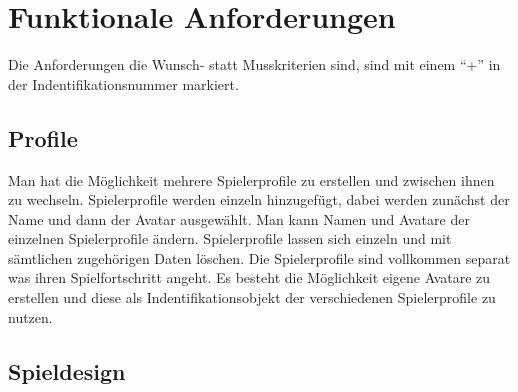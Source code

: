 \chapter{Funktionale Anforderungen}

Die Anforderungen die Wunsch- statt Musskriterien sind, sind mit einem "`+"' in der Indentifikationsnummer markiert.

\section{Profile}

\begin{requirements}
	Man hat die Möglichkeit mehrere Spielerprofile zu erstellen und zwischen ihnen zu wechseln.
	 Spielerprofile werden einzeln hinzugefügt, dabei werden zunächst der Name und dann der Avatar ausgewählt.
	 Man kann Namen und Avatare der einzelnen Spielerprofile ändern.
	 Spielerprofile lassen sich einzeln und mit sämtlichen zugehörigen Daten löschen.
	Die Spielerprofile sind vollkommen separat was ihren Spielfortschritt angeht.
	Es besteht die Möglichkeit eigene Avatare zu erstellen und diese als Indentifikationsobjekt der verschiedenen Spielerprofile zu nutzen.
\end{requirements}

\section{Spieldesign}

